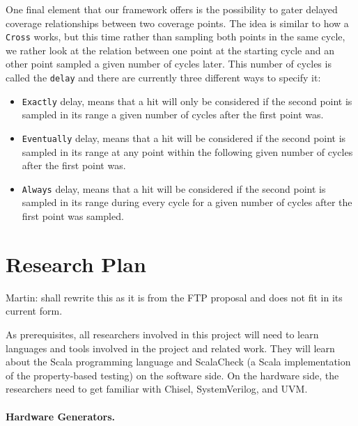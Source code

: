 \documentclass[conference]{IEEEtran}
\newcommand{\martin}[1]{{\color{blue} Martin: #1}}
\begin{document}
One final element that our framework offers is the possibility to gater delayed coverage relationships between two coverage points. The idea is similar to how a \texttt{Cross} works, but this time rather than sampling both points in the same cycle, we rather look at the relation between one point at the starting cycle and an other point sampled a given number of cycles later. This number of cycles is called the \texttt{delay} and there are currently three different ways to specify it:  
\begin{itemize}
 \item \texttt{Exactly} delay, means that a hit will only be considered if the second point is sampled in its range a given number of cycles after the first point was.
 \item \texttt{Eventually} delay, means that a hit will be considered if the second point is sampled in its range at any point within the following given number of cycles after the first point was.  
 \item \texttt{Always} delay, means that a hit will be considered if the second point is sampled in its range during every cycle for a given number of cycles after the first point was sampled.
\end{itemize}


\section{Research Plan} %

\martin{shall rewrite this as it is from the FTP proposal and does not
fit in its current form.}


As prerequisites, all researchers involved in this project will need to learn
languages and tools involved in the project and related work.
They will learn about the Scala programming language and ScalaCheck
(a Scala implementation of the property-based testing) on the software side.
On the hardware side,
the researchers need to get familiar with Chisel, SystemVerilog, and
UVM.


\paragraph{Hardware Generators.}
\end{document}
